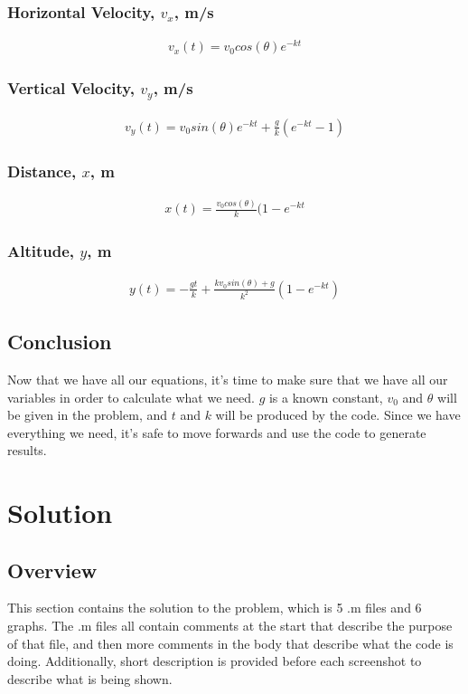 \documentclass[oneside]{article}
\begin{document}
\subsubsection{Horizontal Velocity, $v_x$, m/s}
    \begin{align}
        v_x(t) = v_0cos(\theta)e^{-kt}
    \end{align}
\subsubsection{Vertical Velocity, $v_y$, m/s}
    \begin{align}
        v_y(t) = v_0sin(\theta)e^{-kt} + \frac{g}{k}(e^{-kt} -1)
    \end{align}
\subsubsection{Distance, $x$, m}
    \begin{align}
        x(t) = \frac{v_0cos(\theta)}{k}(1-e^{-kt}
    \end{align}
\subsubsection{Altitude, $y$, m}
    \begin{align}
        y(t) = -\frac{gt}{k} + \frac{kv_0sin(\theta) + g}{k^2}(1-e^{-kt})
    \end{align}
\subsection{Conclusion}
Now that we have all our equations, it's time to make sure that we have all our variables in order to calculate what we need. $g$ is a known constant, $v_0$ and $\theta$ will be given in the problem, and $t$ and $k$ will be produced by the code. Since we have everything we need, it's safe to move forwards and use the code to generate results.\\

\clearpage

\section{Solution}
\subsection{Overview}
This section contains the solution to the problem, which is 5 .m files and 6 graphs. The .m files all contain comments at the start that describe the purpose of that file, and then more comments in the body that describe what the code is doing. Additionally, short description is provided before each screenshot to describe what is being shown.
\newpage
\end{document}
